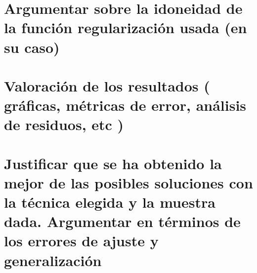 \documentclass{article}
\begin{document}
	
	
	\section{Argumentar sobre la idoneidad de la función regularización usada (en su caso)} %
	
	
	
	\section{Valoración de los resultados ( gráficas, métricas de error, análisis de residuos, etc )} %
	
	
	
	\section{Justificar que se ha obtenido la mejor de las posibles soluciones con la técnica elegida y la muestra dada. Argumentar en términos de los errores de ajuste y generalización} %
	
	
	
\end{document}
